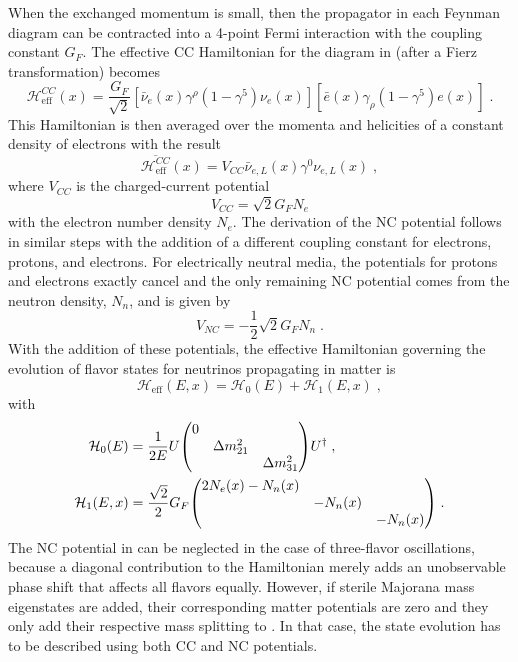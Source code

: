 When the exchanged momentum is small, then the propagator in each Feynman diagram can be contracted into a 4-point Fermi interaction with the coupling constant $G_F$.
The effective CC Hamiltonian for the diagram in  (after a Fierz transformation) becomes
\begin{equation}
    \mathcal{H}_\mathrm{eff}^{CC}(x) = \frac{G_F}{\sqrt{2}}
    [\bar{\nu}_e(x)\gamma^\rho(1 - \gamma^5)\nu_e(x)]
    [\bar{e}(x)\gamma_\rho(1 - \gamma^5)e(x)]\;.\label{eq:h-eff-cc}
\end{equation}
This Hamiltonian is then averaged over the momenta and helicities of a constant density of electrons with the result
\begin{equation}
    \overline{\mathcal{H}_\mathrm{eff}^{CC}}(x) = V_{CC} \bar{\nu}_{e,L}(x)\gamma^0\nu_{e,L}(x)\;,
\end{equation}
where $V_{CC}$ is the charged-current potential
\begin{equation}
    V_{CC} = \sqrt{2}G_F N_e
\end{equation}
with the electron number density $N_e$.
The derivation of the NC potential follows in similar steps with the addition of a different coupling constant for electrons, protons, and electrons.
For electrically neutral media, the potentials for protons and electrons exactly cancel and the only remaining NC potential comes from the neutron density, $N_n$, and is given by
\begin{equation}
    V_{NC} = -\frac{1}{2}\sqrt{2}G_F N_n\;.
\end{equation}
With the addition of these potentials, the effective Hamiltonian governing the evolution of flavor states for neutrinos propagating in matter is
\begin{equation}
\mathcal{H}_\mathrm{eff}(E,x) = \mathcal{H}_0(E)  + \mathcal{H}_{1}(E,x)\;,
\end{equation}
with
\begin{subequations}
\label{eq:hamiltonian}
\begin{align}
\mathcal{H}_0 (E) &= \frac{1}{2E} U
\mqty(\dmat{0 , \Delta m^2_{21}, \Delta m^2_{31}})
U^\dag \label{eq:h0-flav-basis}\;,\\
\mathcal{H}_1 (E,x) &= \frac{\sqrt{2}}{2} G_F
\mqty(\dmat{2N_e(x) - N_n(x), -N_n(x), -N_n(x)})
\;.\label{eq:hi-flav-basis}
\end{align}
\end{subequations}
The NC potential in  can be neglected in the case of three-flavor oscillations, because a diagonal contribution to the Hamiltonian merely adds an unobservable phase shift that affects all flavors equally.
However, if sterile Majorana  mass eigenstates are added, their corresponding matter potentials are zero and they only add their respective mass splitting to .
In that case, the state evolution has to be described using both CC and NC potentials.

